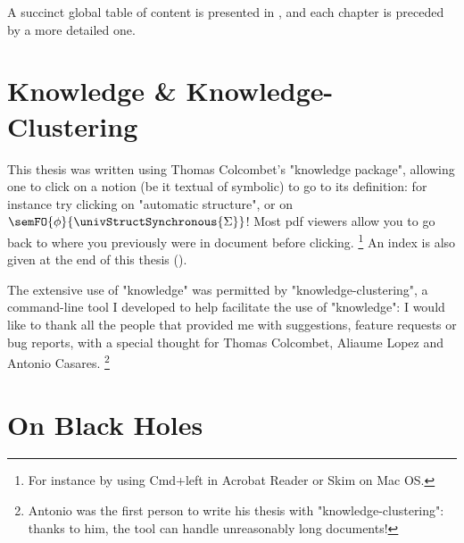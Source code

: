 A succinct global table of content is presented in ,
and each chapter is preceded by a more detailed one.
\begin{marginfigure}
	\centering
\end{marginfigure}

\section*{Knowledge \& Knowledge-Clustering}
This thesis was written using Thomas Colcombet's "knowledge package", allowing
one to click on a notion (be it textual of symbolic) to go to its definition:
for instance try clicking on "automatic structure", or on
$\semFO{\phi}{\univStructSynchronous{\Sigma}}$!
Most pdf viewers allow you to go back to where you previously were
in document before clicking.%
\footnote{For instance
by using Cmd+left in Acrobat Reader or Skim on Mac OS.}
An index is also given at the end of this thesis ().

The extensive use of "knowledge" was permitted by "knowledge-clustering",
a command-line tool I developed to help facilitate the use of "knowledge":
I would like to thank all the people that provided me with suggestions,
feature requests or bug reports, with a special thought for Thomas Colcombet, Aliaume Lopez
and Antonio Casares.%
\footnote{Antonio was the first person to write his thesis
with "knowledge-clustering": thanks to him, the tool can handle
unreasonably long documents!}

\section*{On Black Holes}

